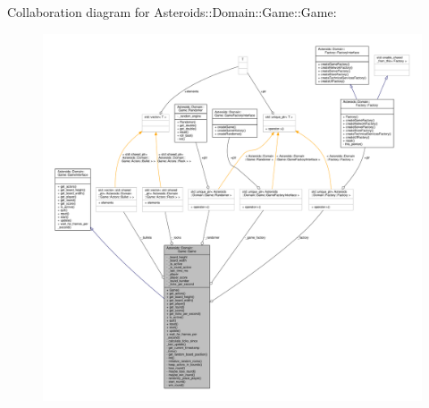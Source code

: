 Collaboration diagram for Asteroids\+:\+:Domain\+:\+:Game\+:\+:Game\+:\nopagebreak
\begin{figure}[H]
\begin{center}
\leavevmode
\includegraphics[width=350pt]{classAsteroids_1_1Domain_1_1Game_1_1Game__coll__graph}
\end{center}
\end{figure}
